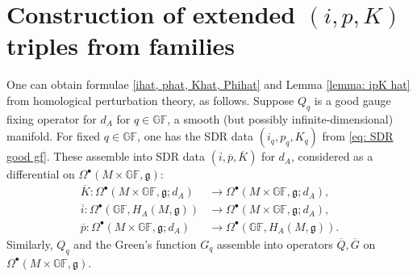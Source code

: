\documentclass[11pt,a4paper]{amsart}
\theoremstyle{plain} %
\theoremstyle{definition}
\theoremstyle{remark}
\newcommand{\g}{\mathfrak{g}}
\newcommand{\bt}{\bullet}
\newcommand{\ra}{\rightarrow}
\newcommand{\wh}{\widehat}
\newcommand{\Kb}{\overline{K}}
\newcommand{\ib}{\overline{i}}
\newcommand{\pb}{\overline{p}}
\newcommand{\Qb}{\overline{Q}}
\newcommand{\Gb}{\overline{G}}
\begin{document}
\section{Construction of extended $(i,p,K)$ triples from families}%
\label{sss: extended ipK triples from families}
One can obtain formulae \eqref{ihat, phat, Khat, Phihat} and Lemma \ref{lemma: ipK hat} from homological perturbation theory, as follows. Suppose $Q_q$ is a good gauge fixing operator for $d_A$ for $q \in \mathbb{GF}$, a smooth (but possibly infinite-dimensional) manifold. For fixed $q \in \mathbb{GF}$, one has the SDR data $(i_q,p_q,K_q)$ from \eqref{eq: SDR good gf}. These assemble into SDR data 
$(\ib,\pb,\Kb)$ for $d_A$, considered as a differential on $\Omega^\bullet(M\times\mathbb{GF},\g)$: 
\begin{equation}
\begin{aligned}
    \Kb \colon  \Omega^\bullet(M \times \mathbb{GF},\g;d_A) &\to \Omega^\bullet(M \times \mathbb{GF},\g;d_A), \\
    \ib \colon  \Omega^\bullet(\mathbb{GF},H_A(M,\g)) &\to \Omega^\bullet(M \times \mathbb{GF},\g;d_A),  \\
   \pb\colon \Omega^\bullet(M \times \mathbb{GF},\g;d_A) &\to \Omega^\bullet(\mathbb{GF},H_A(M,\g)) .
\end{aligned}
\end{equation}
Similarly, $Q_q$ and the Green's function $G_q$ assemble into operators $\Qb,\Gb$ on $\Omega^\bt(M\times \mathbb{GF},\g)$.
\end{document}
